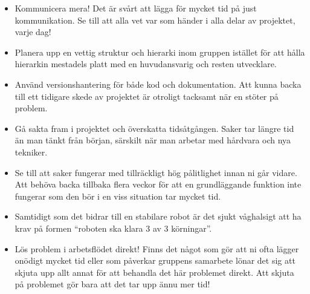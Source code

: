 \documentclass{article}
\begin{document}
\begin{itemize}
    \item Kommunicera mera! Det är svårt att lägga för mycket tid på just kommunikation. Se till att alla vet var som händer i alla delar av projektet, varje dag!
    \item Planera upp en vettig struktur och hierarki inom gruppen istället för att hålla hierarkin mestadels platt med en huvudansvarig och resten utvecklare.
    \item Använd versionshantering för både kod och dokumentation. Att kunna backa till ett tidigare skede av projektet är otroligt tacksamt när en stöter på problem.
    \item Gå sakta fram i projektet och överskatta tidsåtgången. Saker tar längre tid än man tänkt från början, särskilt när man arbetar med hårdvara och nya tekniker.
    \item Se till att saker fungerar med tillräckligt hög pålitlighet innan ni går vidare. Att behöva backa tillbaka flera veckor för att en grundläggande funktion inte fungerar som den bör i en viss situation tar mycket tid.
    \item Samtidigt som det bidrar till en stabilare robot är det sjukt våghalsigt att ha krav på formen ``roboten ska klara 3 av 3 körningar''.
    \item Lös problem i arbetsflödet direkt! Finns det något som gör att ni ofta lägger onödigt mycket tid eller som påverkar gruppens samarbete lönar det sig att skjuta upp allt annat för att behandla det här problemet direkt. Att skjuta på problemet gör bara att det tar upp ännu mer tid!
\end{itemize}

\nocite{*}
{}

\end{document}

